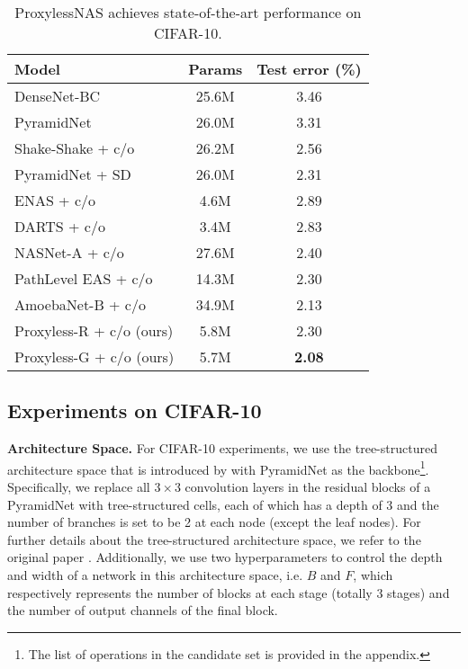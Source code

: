 \documentclass{article} \usepackage{iclr2019_conference,times}
\newcommand{\minisection}[1]{\vspace{5pt}\noindent\textbf{#1.}}
\begin{document}
\begin{table}[t]
    \vspace{-10pt}
    \centering
    \begin{tabular}{l | c | c }
    	\hline
    	Model & Params & Test error (\%) \\
    	\hline
    	DenseNet-BC \citep{huang2017densely} & 25.6M & 3.46 \\ 
    	PyramidNet \citep{han2017deep} & 26.0M & 3.31 \\
    	Shake-Shake + c/o \citep{devries2017improved} & 26.2M & 2.56 \\
    	PyramidNet + SD \citep{yamada2018shakedrop} & 26.0M & 2.31 \\
    	\hline
    	ENAS + c/o \citep{pham2018efficient} & 4.6M & 2.89 \\
    	DARTS + c/o \citep{liu2018darts} & 3.4M & 2.83 \\
    	NASNet-A + c/o \citep{zoph2017learning} & 27.6M & 2.40 \\
    	PathLevel EAS + c/o \citep{cai2018path} & 14.3M & 2.30 \\
    	AmoebaNet-B + c/o \citep{real2018regularized} & 34.9M & 2.13 \\
    	\hline
    	Proxyless-R + c/o (ours) & 5.8M & 2.30 \\ 
    	Proxyless-G + c/o (ours) & 5.7M & \textbf{2.08} \\
    	\hline
    \end{tabular}
    \caption{ ProxylessNAS achieves state-of-the-art performance on CIFAR-10.}\label{tab:cifar_main}
\end{table}

\subsection{Experiments on CIFAR-10}
\minisection{Architecture Space}
For CIFAR-10 experiments, we use the tree-structured architecture space that is introduced by \cite{cai2018path} with PyramidNet \citep{han2017deep} as the backbone\footnote{The list of operations in the candidate set is provided in the appendix.}. Specifically, we replace all $3 \times 3$ convolution layers in the residual blocks of a PyramidNet with tree-structured cells, each of which has a depth of 3 and the number of branches is set to be 2 at each node (except the leaf nodes). 
For further details about the tree-structured architecture space, we refer to the original paper \citep{cai2018path}. Additionally, we use two hyperparameters to control the depth and width of a network in this architecture space, i.e. $B$ and $F$, which respectively represents the number of blocks at each stage (totally 3 stages) and the number of output channels of the final block. 
\end{document}
